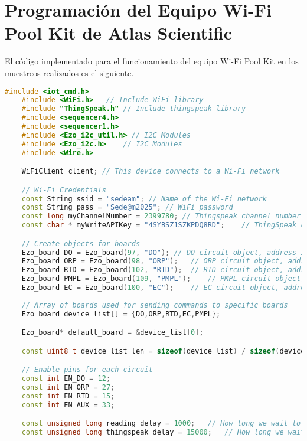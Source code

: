 \chapter{Programación del Equipo Wi-Fi Pool Kit de Atlas Scientific}

El código implementado para el funcionamiento del equipo Wi-Fi Pool Kit en los muestreos realizados es el siguiente.

\begin{lstlisting}[language=C++]
    #include <iot_cmd.h>
    #include <WiFi.h>   // Include WiFi library 
    #include "ThingSpeak.h" // Include thingspeak library
    #include <sequencer4.h>  
    #include <sequencer1.h>  
    #include <Ezo_i2c_util.h> // I2C Modules 
    #include <Ezo_i2c.h>    // I2C Modules
    #include <Wire.h>

    WiFiClient client; // This device connects to a Wi-Fi network

    // Wi-Fi Credentials
    const String ssid = "sedeam"; // Name of the Wi-Fi network
    const String pass = "Sede@m2025"; // WiFi password
    const long myChannelNumber = 2399780; // Thingspeak channel number
    const char * myWriteAPIKey = "4SYBSZ1SZKPDQ8RD";    // ThingSpeak API Key

    // Create objects for boards
    Ezo_board DO = Ezo_board(97, "DO"); // DO circuit object, address is 97 and name is "DO"
    Ezo_board ORP = Ezo_board(98, "ORP");   // ORP circuit object, address is 98 and name is "ORP"
    Ezo_board RTD = Ezo_board(102, "RTD");  // RTD circuit object, address is 102 and name is "RTD"
    Ezo_board PMPL = Ezo_board(109, "PMPL");    // PMPL circuit object, address is 109 and name is "PMPL"
    Ezo_board EC = Ezo_board(100, "EC");    // EC circuit object, address is 100 and name is "EC"
    
    // Array of boards used for sending commands to specific boards
    Ezo_board device_list[] = {DO,ORP,RTD,EC,PMPL};

    Ezo_board* default_board = &device_list[0];

    const uint8_t device_list_len = sizeof(device_list) / sizeof(device_list[0]);

    // Enable pins for each circuit
    const int EN_DO = 12;
    const int EN_ORP = 27;
    const int EN_RTD = 15;
    const int EN_AUX = 33;

    const unsigned long reading_delay = 1000;   // How long we wait to receive a response, in milliseconds
    const unsigned long thingspeak_delay = 15000;   // How long we wait to send values to thingspeak, in milliseconds


\end{lstlisting}
